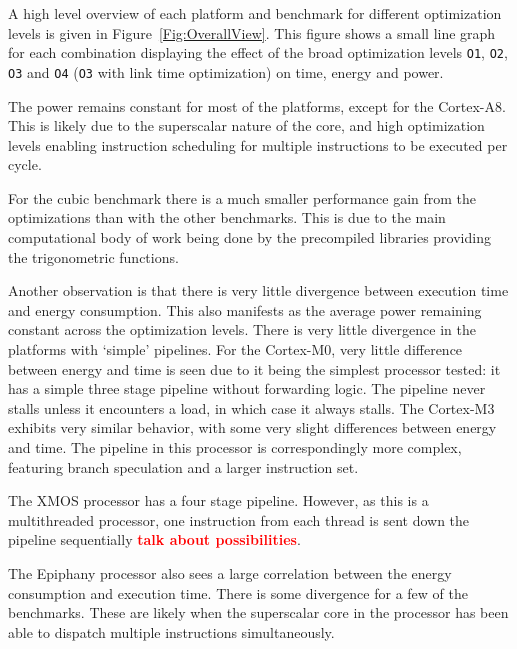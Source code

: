 \documentclass[twocolumn]{article}
\newcommand{\todo}[1]{\textbf{\textcolor{red}{#1}}}
\begin{document}
A high level overview of each platform and benchmark for different optimization levels is given in Figure~\ref{Fig:OverallView}. This figure shows a small line graph for each combination displaying the effect of the broad optimization levels \texttt{O1}, \texttt{O2}, \texttt{O3} and \texttt{O4} (\texttt{O3} with link time optimization) on time, energy and power.

The power remains constant for most of the platforms, except for the Cortex-A8. This is likely due to the superscalar nature of the core, and high optimization levels enabling instruction scheduling for multiple instructions to be executed per cycle.

For the cubic benchmark there is a much smaller performance gain from the optimizations than with the other benchmarks. This is due to the main computational body of work being done by the precompiled libraries providing the trigonometric functions.

Another observation is that there is very little divergence between execution time and energy consumption. This also manifests as the average power remaining constant across the optimization levels. There is very little divergence in the platforms with `simple' pipelines. For the Cortex-M0, very little difference between energy and time is seen due to it being the simplest processor tested: it has a simple three stage pipeline without forwarding logic. The pipeline never stalls unless it encounters a load, in which case it always stalls. The Cortex-M3 exhibits very similar behavior, with some very slight differences between energy and time. The pipeline in this processor is correspondingly more complex, featuring branch speculation and a larger instruction set.

The XMOS processor has a four stage pipeline. However, as this is a multithreaded processor, one instruction from each thread is sent down the pipeline sequentially \todo{talk about possibilities}.

The Epiphany processor also sees a large correlation between the energy consumption and execution time. There is some divergence for a few of the benchmarks. These are likely when the superscalar core in the processor has been able to dispatch multiple instructions simultaneously.
\end{document}
